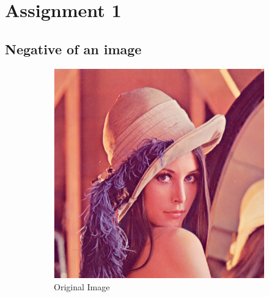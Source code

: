 \documentclass[a4paper,16pt]{article}
\begin{document}
	{
		\doublespacing
		{
			\renewcommand\contentsname{\Huge Contents}
			\renewcommand\cftsubsecfont{\large}
			\vspace{0.4in}
			\doublespacing
			\tableofcontents
		}
	}
	\newpage
	
	\section{Assignment 1}
	\vspace{0.2in}
	\subsection{Negative of an image}
	\indent	
	\begin{figure}[h!]
		\begin{subfigure}[h]{0.4\linewidth}
			\includegraphics[width=\linewidth]{original}
			\caption{Original Image}
		\end{subfigure}
		\hfill
		\begin{subfigure}[h]{0.4\linewidth}

\end{subfigure}
\end{figure}
\end{document}
